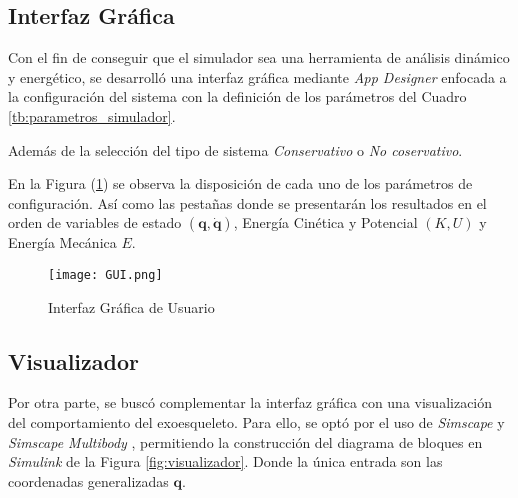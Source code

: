 \subsection{Interfaz Gráfica}
    \noindent Con el fin de conseguir que el simulador sea una herramienta de análisis dinámico y energético,
    se desarrolló una interfaz gráfica mediante \emph{App Designer} \cite{app_designer} enfocada a
    la configuración del sistema con la definición de los parámetros
    del Cuadro \ref{tb:parametros_simulador}.
    
    Además de la selección del tipo de sistema \emph{Conservativo} o \emph{No coservativo}. 
    \begin{table}[H]
        \centering
        \begin{center}
            \caption{Parámetros de configuración del simulador} 
            \centering
            \end{center}
    \end{table}
    En la Figura (\ref{fig:GUI}) se observa la disposición de cada uno de los parámetros de configuración. Así
    como las pestañas donde se presentarán los resultados en el orden de variables de estado $(\boldsymbol{q}, \boldsymbol{\dot{q}})$,
    Energía Cinética y Potencial $(K, U)$ y Energía Mecánica $E$. 
    \begin{figure}[H]
        \texttt{[image: GUI.png]}
        \centering
        \caption{ Interfaz Gráfica de Usuario }
        \label{fig:GUI}
    \end{figure}

\subsection{Visualizador}
    \noindent Por otra parte, se buscó complementar la interfaz gráfica con una visualización del comportamiento
    del exoesqueleto. Para ello, se optó por el uso de \emph{Simscape} \cite{simscape} y \emph{Simscape Multibody} \cite{SimscapeMultibody}, 
    permitiendo la construcción del diagrama de bloques en \emph{Simulink} de la Figura \ref{fig:visualizador}.
    Donde la única entrada son las coordenadas generalizadas $\boldsymbol{q}$.

